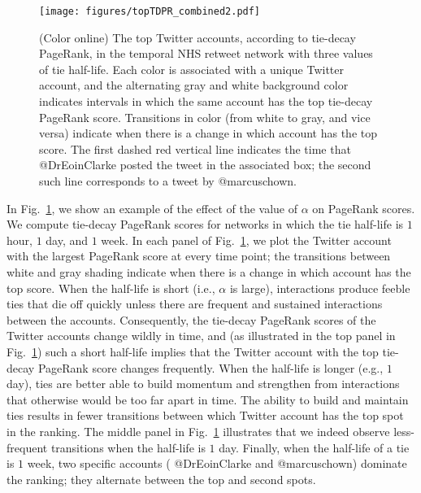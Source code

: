\documentclass[journal,transmag]{IEEEtran}
\begin{document}
\begin{figure}
  \centering
   \texttt{[image: figures/topTDPR\_combined2.pdf]}
   \caption{(Color online) The top Twitter accounts, according to
     tie-decay PageRank, in the temporal NHS retweet network with
     three values of tie half-life. Each 
     color is associated with
     a unique Twitter account, and the alternating gray and white
     background color indicates intervals in which the same account
     has the top tie-decay PageRank score. Transitions in color
     (from white to gray, and vice versa) indicate when there is a change in which account has the top score.
     The first dashed red vertical line
     indicates the time
     that {\sc @DrEoinClarke} posted the tweet in
     the associated box; the second such line corresponds to a tweet by
     {\sc @marcuschown}.  }
  \label{fig:decayPRalphas}
\end{figure}


In Fig.~\ref{fig:decayPRalphas}, we show an example of the effect of
the value of $\alpha$ on PageRank scores. We compute tie-decay PageRank
scores for networks in which the tie half-life is $1$ hour, $1$ day,
and $1$ week. In each panel of Fig.~\ref{fig:decayPRalphas}, we plot
the Twitter account with the largest PageRank score at every time
point; the transitions between white and gray shading indicate when there is a change in which account has the top score.
 When the
half-life is short (i.e., $\alpha$ is large), interactions produce
feeble ties that die off quickly unless there are frequent and
sustained interactions between the accounts. Consequently, the
tie-decay PageRank scores of the Twitter accounts change wildly in time, and (as
illustrated in the top panel in Fig.~\ref{fig:decayPRalphas}) such a
short half-life implies that the Twitter account with the top tie-decay PageRank
score changes frequently. When the half-life is longer (e.g., $1$
day), ties are better able to build momentum and strengthen from
interactions that otherwise would be too far apart in time. The ability to build and maintain ties results in fewer transitions between which
Twitter account has the top spot in the ranking. The middle panel in
Fig.~\ref{fig:decayPRalphas} illustrates that we indeed observe
less-frequent transitions when the half-life is $1$ day.  Finally,
when the half-life of a tie is $1$ week, two specific accounts ({\sc
  @DrEoinClarke} and {\sc @marcuschown}) dominate the ranking; they
alternate between the top and second spots.
\end{document}
